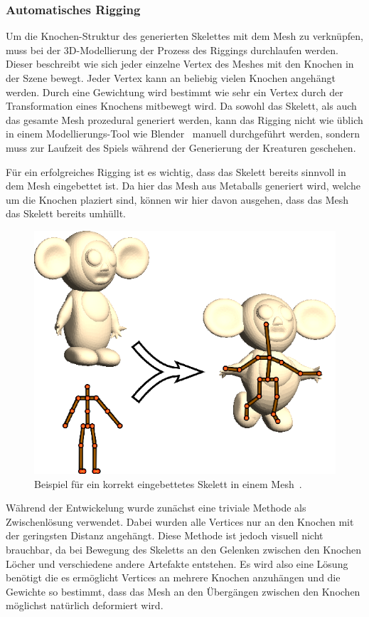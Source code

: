 \subsubsection{Automatisches Rigging}
Um die Knochen-Struktur des generierten Skelettes mit dem Mesh zu verknüpfen, muss bei der 3D-Modellierung der Prozess des Riggings durchlaufen werden. Dieser beschreibt wie sich jeder einzelne Vertex des Meshes mit den Knochen in der Szene bewegt. Jeder Vertex kann an beliebig vielen Knochen angehängt werden. Durch eine Gewichtung wird bestimmt wie sehr ein Vertex durch der Transformation eines Knochens mitbewegt wird.
Da sowohl das Skelett, als auch das gesamte Mesh prozedural generiert werden, kann das Rigging nicht wie üblich in einem Modellierungs-Tool wie Blender~\cite{blender} manuell durchgeführt werden, sondern muss zur Laufzeit des Spiels während der Generierung der Kreaturen geschehen.

Für ein erfolgreiches Rigging ist es wichtig, dass das Skelett bereits sinnvoll in dem Mesh eingebettet ist. Da hier das Mesh aus Metaballs generiert wird, welche um die Knochen plaziert sind, können wir hier davon ausgehen, dass das Mesh das Skelett bereits \grqq{} umhüllt.


\begin{figure}[h!]
	\centering
	\includegraphics[width=0.6\linewidth]{resources/img/skeleton_embedding.png}
	\caption{Beispiel für ein korrekt eingebettetes Skelett in einem Mesh~\cite{bone_heat_paper}.}
	\label{fig:skeleton_embedding}
\end{figure}

Während der Entwickelung wurde zunächst eine triviale Methode als Zwischenlösung verwendet. Dabei wurden alle Vertices nur an den Knochen mit der geringsten Distanz angehängt. Diese Methode ist jedoch visuell nicht brauchbar, da bei Bewegung des Skeletts an den Gelenken zwischen den Knochen Löcher und verschiedene andere Artefakte entstehen. Es wird also eine Lösung benötigt die es ermöglicht Vertices an mehrere Knochen anzuhängen und die Gewichte so bestimmt, dass das Mesh an den Übergängen zwischen den Knochen möglichst natürlich deformiert wird.

